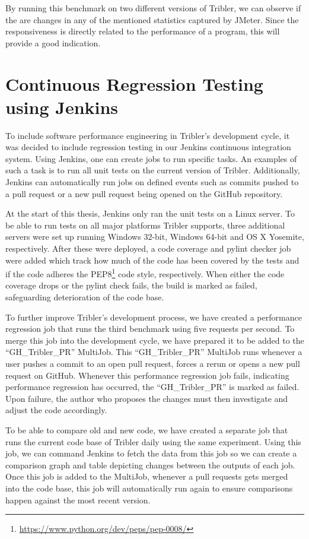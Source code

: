 By running this benchmark on two different versions of Tribler, we can observe if the are changes in any of the mentioned statistics captured by JMeter.
Since the responsiveness is directly related to the performance of a program, this will provide a good indication.


\section{Continuous Regression Testing using Jenkins}

To include software performance engineering in Tribler's development cycle, it was decided to include regression testing in our Jenkins continuous integration system.
Using Jenkins, one can create jobs to run specific tasks.
An examples of such a task is to run all unit tests on the current version of Tribler.
Additionally, Jenkins can automatically run jobs on defined events such as commits pushed to a pull request or a new pull request being opened on the GitHub repository.

At the start of this thesis, Jenkins only ran the unit tests on a Linux server.
To be able to run tests on all major platforms Tribler supports, three additional servers were set up running Windows 32-bit, Windows 64-bit and OS X Yosemite, respectively.
After these were deployed, a code coverage and pylint checker job were added which track how much of the code has been covered by the tests and if the code adheres the PEP8\footnote{\url{https://www.python.org/dev/peps/pep-0008/}} code style, respectively.
When either the code coverage drops or the pylint check fails, the build is marked as failed, safeguarding deterioration of the code base.

To further improve Tribler's development process, we have created a performance regression job that runs the third benchmark using five requests per second.
To merge this job into the development cycle, we have prepared it to be added to the \enquote{GH\_Tribler\_PR} MultiJob.
This \enquote{GH\_Tribler\_PR} MultiJob runs whenever a user pushes a commit to an open pull request, forces a rerun or opens a new pull request on GitHub.
Whenever this performance regression job fails, indicating performance regression has occurred, the \enquote{GH\_Tribler\_PR} is marked as failed.
Upon failure, the author who proposes the changes must then investigate and adjust the code accordingly.

To be able to compare old and new code, we have created a separate job that runs the current code base of Tribler daily using the same experiment.
Using this job, we can command Jenkins to fetch the data from this job so we can create a comparison graph and table depicting changes between the outputs of each job.
Once this job is added to the MultiJob, whenever a pull requests gets merged into the code base, this job will automatically run again to ensure comparisons happen against the most recent version.

